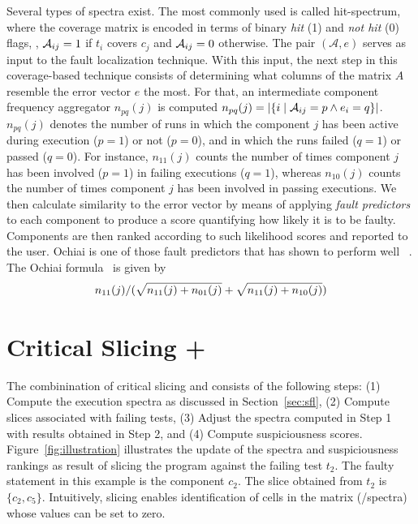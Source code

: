\documentclass{article}
\begin{document}
Several types of spectra exist.  The most commonly used is called
hit-spectrum, where the coverage matrix is encoded in terms of binary
\emph{hit} (1) and \emph{not hit} (0) flags, \ie{}, $\mathcal{A}_{ij} = 1$ if
$t_i$ covers $c_j$ and $\mathcal{A}_{ij} = 0$ otherwise.  The pair
$(\mathcal{A},e)$ serves as input to the fault localization technique.
With this input, the next step in this coverage-based technique
consists of determining what columns of the matrix $A$ resemble the
error vector $e$ the most.  For that, an intermediate component
frequency aggregator $n_{pq}(j)$ is computed $n_{pq}(j) = |\{i\mid
\mathcal{A}_{ij}=p \wedge e_i=q\}|$. $n_{pq}(j)$ denotes the number of runs in
which the component $j$ has been active during execution ($p = 1$) or
not ($p=0$), and in which the runs failed ($q = 1$) or passed ($q =
0$).  For instance, $n_{11}(j)$ counts the number of times component
$j$ has been involved ($p = 1$) in failing executions ($q = 1$),
whereas $n_{10}(j)$ counts the number of times component $j$ has been
involved in passing executions. We then calculate similarity to the
error vector by means of applying \emph{fault predictors} to each
component to produce a score quantifying how likely it is to be
faulty.  Components are then ranked according to such likelihood
scores and reported to the user. Ochiai is one of those fault
predictors that has shown to perform well ~\cite{Pearson:2017:EIF:3097368.3097441,7390282}.
The Ochiai formula~\cite{DBLP:conf/prdc/AbreuZG06} is given by
\[n_{11}(j)/(\sqrt{n_{11}(j)+n_{01}(j)} + \sqrt{n_{11}(j)+n_{10}(j)})\]

\section{Critical Slicing + \sfl{}}
\label{sec:combination}

The combinination of critical slicing and \sfl{} consists of the
following steps: (1) Compute the execution spectra as discussed in
Section~\ref{sec:sfl}, (2) Compute slices associated with failing
tests, (3) Adjust the spectra computed in Step 1 with results obtained
in Step 2, and (4) Compute suspiciousness
scores. Figure~\ref{fig:illustration} illustrates the update of the
spectra and suspiciousness rankings as result of slicing the program
against the failing test $t_2$. The faulty statement in this example
is the component $c_2$.  The slice obtained from $t_2$ is $\{c_2,
c_5\}$.  Intuitively, slicing enables identification of cells in the
matrix (/spectra) whose values can be set to zero.

\end{document}
